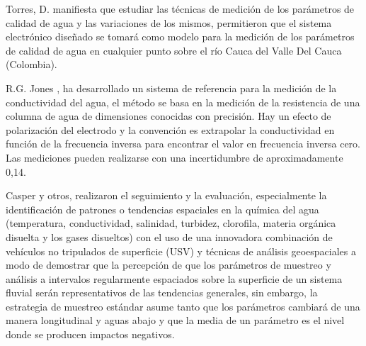 Torres, D. \cite{torres2009diseno} manifiesta que estudiar las t\'ecnicas de medici\'on de los par\'ametros de calidad de agua y las variaciones de los mismos, permitieron que el sistema electr\'onico dise\~nado se tomar\'a como modelo para la medici\'on de los par\'ametros de calidad de agua en cualquier punto sobre el río Cauca del Valle Del Cauca (Colombia).

R.G. Jones \cite{jones2002measurements}, ha desarrollado un sistema de referencia para la medici\'on de la conductividad del agua, el m\'etodo se basa en la medici\'on de la resistencia de una columna de agua de dimensiones conocidas con precisión. Hay un efecto de polarización del electrodo y la convención es extrapolar la conductividad en funci\'on de la frecuencia inversa para encontrar el valor en frecuencia inversa cero. Las mediciones pueden realizarse con una incertidumbre de aproximadamente 0,14.

Casper y otros\cite{casper2007combining}, realizaron el seguimiento y la evaluaci\'on, especialmente la identificaci\'on de patrones o tendencias espaciales en la qu\'imica del agua (temperatura, conductividad, salinidad, turbidez, clorofila, materia org\'anica disuelta y los gases disueltos) con el uso de una innovadora combinaci\'on de veh\'iculos no tripulados de superficie (USV) y t\'ecnicas de an\'alisis geoespaciales a modo de demostrar que la percepci\'on de que los par\'ametros de muestreo y an\'alisis a intervalos regularmente espaciados sobre la superficie de un sistema fluvial ser\'an representativos de las tendencias generales, sin embargo, la estrategia de muestreo est\'andar asume tanto que los par\'ametros cambiar\'a de una manera longitudinal y aguas abajo y que la media de un par\'ametro es el nivel donde se producen impactos negativos. 

